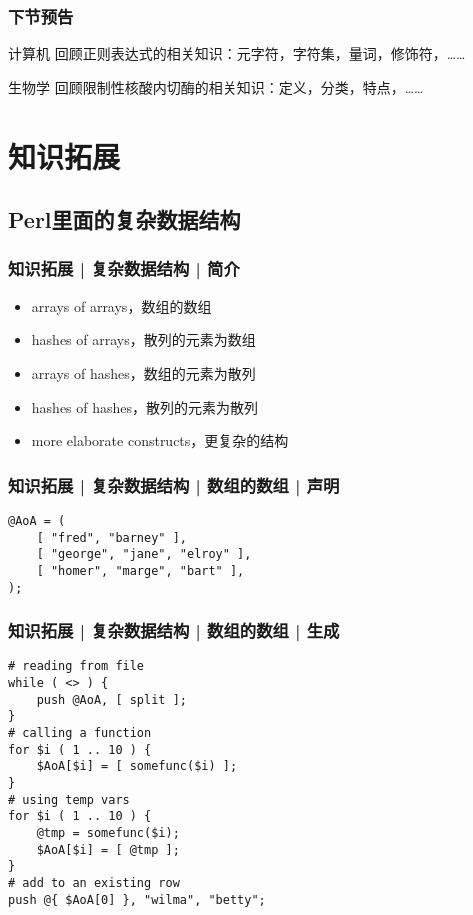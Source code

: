 \begin{frame}
  \frametitle{下节预告}
  \begin{block}{计算机}
    回顾正则表达式的相关知识：元字符，字符集，量词，修饰符，……
  \end{block}
  \begin{block}{生物学}
    回顾限制性核酸内切酶的相关知识：定义，分类，特点，……
  \end{block}
\end{frame}

\section{知识拓展}
\subsection{Perl里面的复杂数据结构}
\begin{frame}
  \frametitle{知识拓展 | 复杂数据结构 | 简介}
  \begin{itemize}
    \item arrays of arrays，数组的数组
    \item hashes of arrays，散列的元素为数组
    \item arrays of hashes，数组的元素为散列
    \item hashes of hashes，散列的元素为散列
    \item more elaborate constructs，更复杂的结构
  \end{itemize}
\end{frame}

\begin{frame}[fragile]
  \frametitle{知识拓展 | 复杂数据结构 | 数组的数组 | 声明}
\begin{lstlisting}
@AoA = (
    [ "fred", "barney" ],
    [ "george", "jane", "elroy" ],
    [ "homer", "marge", "bart" ],
);
\end{lstlisting}
\end{frame}

\begin{frame}[fragile]
  \frametitle{知识拓展 | 复杂数据结构 | 数组的数组 | 生成}
\begin{lstlisting}
# reading from file
while ( <> ) {
    push @AoA, [ split ];
}
# calling a function
for $i ( 1 .. 10 ) {
    $AoA[$i] = [ somefunc($i) ];
}
# using temp vars
for $i ( 1 .. 10 ) {
    @tmp = somefunc($i);
    $AoA[$i] = [ @tmp ];
}
# add to an existing row
push @{ $AoA[0] }, "wilma", "betty";
\end{lstlisting}
\end{frame}

